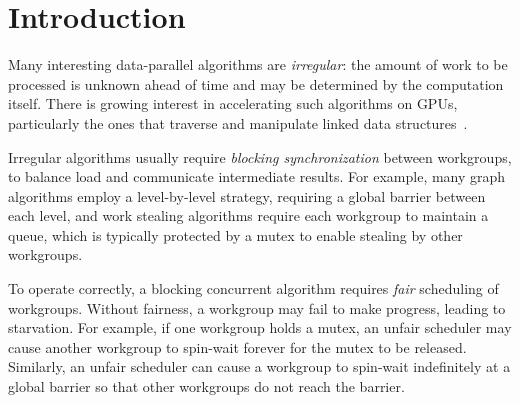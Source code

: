 \documentclass[parskip=half,sigconf,review, anonymous=true, acmcopyrightmode=none]{acmart}
\begin{document}
\section{Introduction}\label{sec:intro}

Many interesting data-parallel algorithms are \emph{irregular}: the amount
of work to be processed is unknown ahead of time and may be determined
by the computation itself.  There is growing interest in accelerating
such algorithms on GPUs, particularly the ones that
traverse and manipulate linked data structures~\cite{owens-persistent,DBLP:conf/ipps/KaleemVPHP16,DBLP:conf/ipps/DavidsonBGO14,DBLP:conf/hipc/HarishN07,DBLP:journals/topc/MerrillGG15,DBLP:conf/egh/VineetHPN09,DBLP:conf/ppopp/NobariCKB12,DBLP:conf/hpcc/SolomonTT10a,DBLP:conf/popl/PrabhuRMH11,DBLP:conf/ppopp/Mendez-LojoBP12,DBLP:conf/oopsla/PaiP16,DBLP:conf/oopsla/SorensenDBGR16,DBLP:conf/egh/CedermanT08,TPO10,BNP12,Pannotia}.

Irregular algorithms usually require \emph{blocking synchronization}
between workgroups, to balance load and communicate intermediate
results.  For example, many graph algorithms employ a level-by-level
strategy, requiring a global barrier between each level, and work
stealing algorithms require each workgroup to maintain a queue, which
is typically protected by a mutex to enable stealing by other
workgroups.

To operate correctly, a blocking concurrent algorithm requires
\emph{fair} scheduling of workgroups.  Without fairness, a
workgroup may fail to make progress, leading to starvation.  For
example, if one workgroup holds a mutex, an unfair scheduler may cause
another workgroup to spin-wait forever for the mutex to be
released.  Similarly, an unfair scheduler can cause a workgroup to spin-wait
indefinitely at a global barrier so that other workgroups do not reach the barrier.
\end{document}
